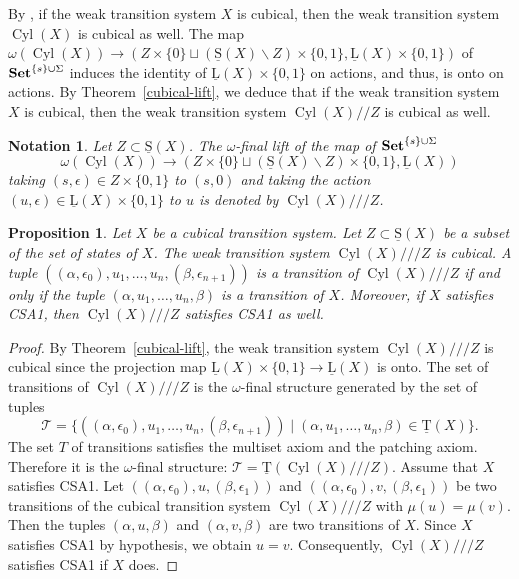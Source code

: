 \documentclass[a4paper,12pt]{amsart}
\newtheorem{prop}[thm]{Proposition}
\newtheorem{nota}[thm]{Notation}
\begin{document}
By \cite[Theorem~3.3]{biscsts1}, if the weak transition system $X$ is
cubical, then the weak transition system $\operatorname{{Cyl}}(X)$ is cubical as well.
The map $\omega(\operatorname{{Cyl}}(X)) \longrightarrow (Z\times \{0\} \sqcup
(\operatorname{\underline{S}}(X)\backslash Z)\times \{0,1\},\operatorname{\underline{L}}(X) \times \{0,1\})$ of ${{{\rm{\mathbf{{Set}}}}}}^{\{s\}\cup
  \Sigma}$ induces the identity of $\operatorname{\underline{L}}(X)\times \{0,1\}$ on actions, and
thus, is onto on actions. By Theorem~\ref{cubical-lift}, we deduce that
if the weak transition system $X$ is cubical, then the weak transition
system $\operatorname{{Cyl}}(X)//Z$ is cubical as well.

\begin{nota} Let $Z\subset \operatorname{\underline{S}}(X)$. The $\omega$-final lift of the map
  of ${{{\rm{\mathbf{{Set}}}}}}^{\{s\}\cup \Sigma}$ \[\omega(\operatorname{{Cyl}}(X)) \longrightarrow (Z\times
  \{0\} \sqcup (\operatorname{\underline{S}}(X)\backslash Z)\times \{0,1\},\operatorname{\underline{L}}(X))\] taking
  $(s,\epsilon)\in Z\times \{0,1\}$ to $(s,0)$ and taking the action
  $(u,\epsilon) \in \operatorname{\underline{L}}(X)\times \{0,1\}$ to $u$ is denoted by
  $\operatorname{{Cyl}}(X)///Z$. \end{nota}

\begin{prop} \label{precalcul0} Let $X$ be a cubical transition system. Let
$Z\subset \operatorname{\underline{S}}(X)$ be a subset of the set of states of $X$.  The weak
transition system $\operatorname{{Cyl}}(X)///Z$ is cubical. A tuple
$((\alpha,\epsilon_0),u_1,\dots,u_n,(\beta,\epsilon_{n+1}))$ is a
transition of $\operatorname{{Cyl}}(X)///Z$ if and only if the tuple
$(\alpha,u_1,\dots,u_n,\beta)$ is a transition of $X$. Moreover, if
$X$ satisfies CSA1, then $\operatorname{{Cyl}}(X)///Z$ satisfies CSA1 as well. \end{prop}

\begin{proof} By Theorem~\ref{cubical-lift}, the weak transition system
$\operatorname{{Cyl}}(X)///Z$ is cubical since the projection map $\operatorname{\underline{L}}(X)\times \{0,1\}
\to \operatorname{\underline{L}}(X)$ is onto.  The set of transitions of $\operatorname{{Cyl}}(X)///Z$ is the
$\omega$-final structure generated by the set of tuples \[\mathcal{T}
= \{((\alpha,\epsilon_0),u_1,\dots,u_n,(\beta,\epsilon_{n+1})) \mid
(\alpha,u_1,\dots,u_n,\beta) \in \operatorname{\underline{T}}(X) \}.\] The set $T$ of
transitions satisfies the multiset axiom and the patching
axiom. Therefore it is the $\omega$-final structure:
$\mathcal{T}=\operatorname{\underline{T}}(\operatorname{{Cyl}}(X)///Z)$. Assume that $X$ satisfies CSA1. Let
$((\alpha,\epsilon_0),u,(\beta,\epsilon_1))$ and
$((\alpha,\epsilon_0),v,(\beta,\epsilon_1))$ be two transitions of the
cubical transition system $\operatorname{{Cyl}}(X)///Z$ with $\mu(u)=\mu(v)$.  Then
the tuples $(\alpha,u,\beta)$ and $(\alpha,v,\beta)$ are two
transitions of $X$. Since $X$ satisfies CSA1 by hypothesis, we obtain
$u=v$. Consequently, $\operatorname{{Cyl}}(X)///Z$ satisfies CSA1 if $X$ does.  \end{proof}
\end{document}
